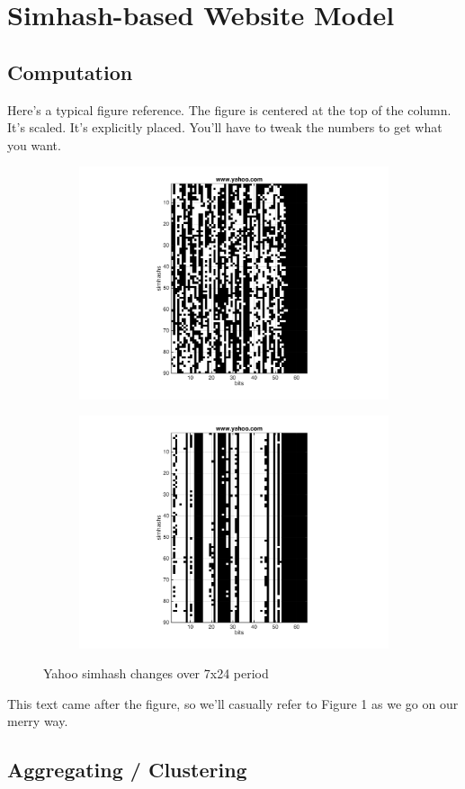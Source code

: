 \section{Simhash-based Website Model}
\label{s:swm}
\subsection{Computation}

Here's a typical figure reference.  The figure is centered at the
top of the column.  It's scaled.  It's explicitly placed.  You'll
have to tweak the numbers to get what you want.\\

\begin{figure}[t]
  \centering
  \begin{subfigure}
    \centering
    \includegraphics[width=.5\textwidth]{fig/yahoo-text}
    \label{fig:yahoo-text}
  \end{subfigure}%
  \begin{subfigure}
    \centering
    \includegraphics[width=.5\textwidth]{fig/yahoo-dom}
    \label{fig:yahoo-dom}
  \end{subfigure}
  \caption{Yahoo simhash changes over 7x24 period}
  \label{fig:yahoo-simhash}
\end{figure}


This text came after the figure, so we'll casually refer to Figure 1
as we go on our merry way.

\subsection{Aggregating / Clustering}

